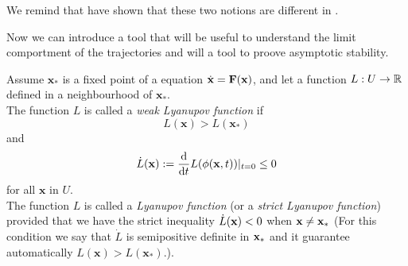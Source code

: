 \begin{remarque}
We remind that have shown that these two notions are different in .
\end{remarque}

Now we can introduce a tool that will be useful to understand the limit comportment of the trajectories and will a tool to proove asymptotic stability.

\begin{definition}
    Assume $\mathbf{x}_*$ is a fixed point of a equation $\dot{\mathbf{x}} = \mathbf{F}(\mathbf{x})$, and let a function $L:U\to\mathbb{R}$ defined in a neighbourhood of $\mathbf{x}_*$.
    \\
    The function $L$ is called a \emph{weak Lyanupov function} if \[L(\mathbf{x})>L(\mathbf{x}_*)\] 
    and 
    \[ \dot{L}(\mathbf{x}):=\frac{\mathrm{d}}{\mathrm{d} t}L(\phi(\mathbf{x},t))|_{t=0} \leq 0 \]
    for all $\mathbf{x}$ in $U$.
    \\
    The function $L$ is called a \emph{Lyanupov function} (or a \emph{strict Lyanupov function}) provided that we have the strict inequality $\dot{L}(\mathbf{x}) < 0$ when $\mathbf{x}\neq\mathbf{x}_*$ (For this condition we say that $\dot{L}$ is semipositive definite in $\mathbf{x}_*$ and it guarantee automatically $L(\mathbf{x})>L(\mathbf{x}_*)$.).
\end{definition}

